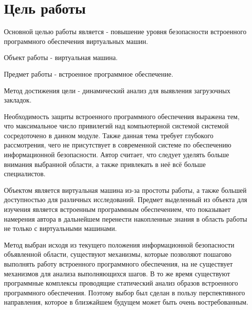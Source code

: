 \chapter{Цель работы}

Основной целью работы является - повышение уровня безопасности встроенного программного обеспечения виртуальных машин.

Объект работы - виртуальная машина.

Предмет работы - встроенное программное обеспечение.

Метод достижения цели - динамический анализ для выявления загрузочных закладок.

Необходимость защиты встроенного программного обеспечения выражена тем,
	что максимальное число привилегий над компьютерной системой системой сосредоточено в данном модуле.
Также данная тема требует глубокого рассмотрения,
	чего не присутствует в современной системе по обеспечению информационной безопасности.
Автор считает, что следует уделять больше внимания выбранной области, а также привлекать в неё всё больше специалистов.

Объектом является виртуальная машина из-за простоты работы, а также большей доступностью для различных исследований.
Предмет выделенный из объекта для изучения является встроенным программным обеспечением, что показывает намерения автора в дальнейшем перенести накопленные знания в область работы не только с виртуальными машинами.

Метод выбран исходя из текущего положения информационной безопасности объявленной области,
	существуют механизмы, которые позволяют пошагово выполнять работу встроенного программного обеспечения,
	на не существует механизмов для анализа выполняющихся шагов.
В то же время существуют программные комплексы проводящие статический анализ образов встроенного программного обеспечения.
Поэтому выбор был сделан в пользу перспективного направления,
	которое в близжайшем будущем может быть очень востребованным.
